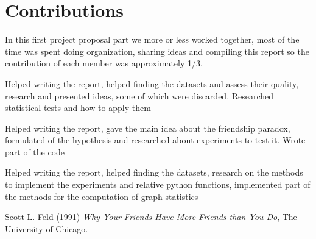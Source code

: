 \documentclass{article}
\begin{document}
\section*{Contributions}
In this first project proposal part we more or less worked together, most of the time was spent doing organization, sharing ideas and compiling this report so the contribution of each member was approximately 1/3.
\begin{description}[font=\normalfont\itshape]
    \item[Lavorati Ippolito:] Helped writing the report, helped finding the datasets and assess their quality, research and presented ideas, some of which were discarded. Researched statistical tests and how to apply them
    \item[Orsolon Ludovico:] Helped writing the report, gave the main idea about the friendship paradox, formulated of the hypothesis and researched about experiments to test it. Wrote part of the code
    \item[Stefani Patrizia:] Helped writing the report, helped finding the datasets, research on the methods to implement the experiments and relative python functions, implemented part of the methods for the computation of graph statistics
\end{description}
\begin{thebibliography}{9}
Scott L. Feld (1991) \emph{Why Your Friends Have More Friends
than You Do}, The University of Chicago.
\end{thebibliography}
\end{document}
